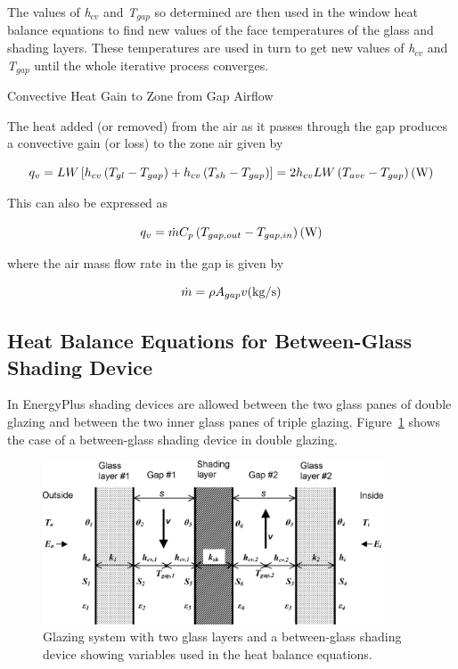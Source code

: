 The values of \emph{h\(_{cv}\)} and \emph{T\(_{gap}\)} so determined are then used in the window heat balance equations to find new values of the face temperatures of the glass and shading layers. These temperatures are used in turn to get new values of \emph{h\(_{cv}\)} and \emph{T\(_{gap}\)} until the whole iterative process converges.

Convective Heat Gain to Zone from Gap Airflow

The heat added (or removed) from the air as it passes through the gap produces a convective gain (or loss) to the zone air given by

\begin{equation}
{q_v} = LW\left[ {{h_{cv}}\left( {{T_{gl}} - {T_{gap}}} \right) + {h_{cv}}\left( {{T_{sh}} - {T_{gap}}} \right)} \right] = 2{h_{cv}}LW\left( {{T_{ave}} - {T_{gap}}} \right){\rm{    (W)}}
\end{equation}

This can also be expressed as

\begin{equation}
{q_v} = \dot m{C_p}\left( {{T_{gap,out}} - {T_{gap,in}}} \right){\rm{    (W)}}
\end{equation}

where the air mass flow rate in the gap is given by

\begin{equation}
\dot m = \rho {A_{gap}}v{\rm{    (kg/s)}}
\end{equation}

\subsection{Heat Balance Equations for Between-Glass Shading Device}\label{heat-balance-equations-for-between-glass-shading-device}

In EnergyPlus shading devices are allowed between the two glass panes of double glazing and between the two inner glass panes of triple glazing. Figure~\ref{fig:glazing-system-with-two-glass-layers-and-a} shows the case of a between-glass shading device in double glazing.

\begin{figure}[hbtp] %
\centering
\includegraphics[width=0.9\textwidth, height=0.9\textheight, keepaspectratio=true]{media/image1691.png}
\caption{Glazing system with two glass layers and a between-glass shading device showing variables used in the heat balance equations. \protect \label{fig:glazing-system-with-two-glass-layers-and-a}}
\end{figure}

